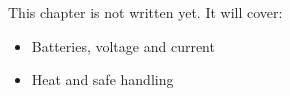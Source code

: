\label{ch:hw7}
\begin{keyidea}
This chapter is not written yet. It will cover:
\begin{itemize}[nosep]
  \item Batteries, voltage and current
  \item Heat and safe handling
\end{itemize}
\end{keyidea}
